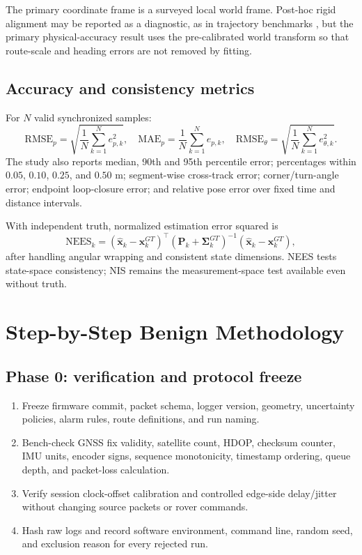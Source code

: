 \documentclass[11pt,a4paper]{article}
\begin{document}
The primary coordinate frame is a surveyed local world frame. Post-hoc rigid
alignment may be reported as a diagnostic, as in trajectory benchmarks
\cite{sturm2012tum}, but the primary physical-accuracy result uses the
pre-calibrated world transform so that route-scale and heading errors are not
removed by fitting.

\subsection{Accuracy and consistency metrics}

For $N$ valid synchronized samples:
\[
\mathrm{RMSE}_{p}=
\sqrt{\frac{1}{N}\sum_{k=1}^{N}e_{p,k}^2},
\quad
\mathrm{MAE}_{p}=\frac{1}{N}\sum_{k=1}^{N}e_{p,k},
\quad
\mathrm{RMSE}_{\theta}=
\sqrt{\frac{1}{N}\sum_{k=1}^{N}e_{\theta,k}^2}.
\]
The study also reports median, 90th and 95th percentile error; percentages
within $0.05$, $0.10$, $0.25$, and $0.50$ m; segment-wise cross-track error;
corner/turn-angle error; endpoint loop-closure error; and relative pose error
over fixed time and distance intervals.

With independent truth, normalized estimation error squared is
\[
\mathrm{NEES}_k=
(\hat{\mathbf x}_k-\mathbf x_k^{GT})^\top
(\mathbf P_k+\boldsymbol\Sigma_k^{GT})^{-1}
(\hat{\mathbf x}_k-\mathbf x_k^{GT}),
\]
after handling angular wrapping and consistent state dimensions. NEES tests
state-space consistency; NIS remains the measurement-space test available even
without truth.

\section{Step-by-Step Benign Methodology}

\subsection{Phase 0: verification and protocol freeze}

\begin{enumerate}
  \item Freeze firmware commit, packet schema, logger version, geometry,
  uncertainty policies, alarm rules, route definitions, and run naming.
  \item Bench-check GNSS fix validity, satellite count, HDOP, checksum counter,
  IMU units, encoder signs, sequence monotonicity, timestamp ordering, queue
  depth, and packet-loss calculation.
  \item Verify session clock-offset calibration and controlled edge-side
  delay/jitter without changing source packets or rover commands.
  \item Hash raw logs and record software environment, command line, random
  seed, and exclusion reason for every rejected run.
\end{enumerate}
\end{document}
